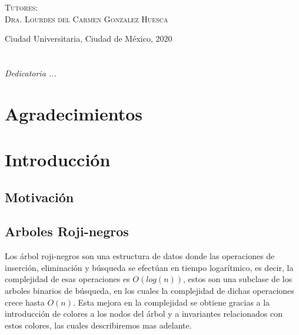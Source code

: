 \documentclass[letterpaper,12pt,oneside]{book}
\newcommand{\arn}{árbol roji-negro}
\theoremstyle{plain}
\theoremstyle{definition}
\theoremstyle{remark}
\begin{document}
\begin{titlepage}
\begin{minipage}[c][0.81\textheight][t]{0.75\textwidth}
\begin{center}
\vspace{0.5cm}

{\large\scshape Tutores:\\[0.3cm] {Dra. Lourdes del Carmen Gonzalez Huesca}}\\[.2in]

\vspace{0.5cm}

\large{Ciudad Universitaria, Ciudad de México,}{ }{2020}
\end{center}
\end{minipage}
\end{titlepage}



\frontmatter
\chapter*{}
\begin{flushright}%
\emph{Dedicatoria ...}
\thispagestyle{empty}
\end{flushright}

\chapter{Agradecimientos}

\tableofcontents
\listoffigures


\mainmatter

\chapter{Introducción} 
\section{Motivación}
\section{Arboles Roji-negros}
Los {{{{\arn}}}s} son una estructura de datos donde las operaciones de inserci\'on, eliminaci\'on y 
búsqueda se efectúan
en tiempo logarítmico, es decir, la complejidad de esas operaciones es $O(log(n))$, estos son una 
subclase de los
arboles binarios de búsqueda, en los cuales la complejidad de dichas operaciones crece hasta $O(n)$. Esta
mejora en la complejidad se obtiene 
gracias a la introducción de colores a los nodos del \'arbol y a invariantes relacionados con estos 
colores, las cuales describiremos 
mas adelante.
\end{document}
